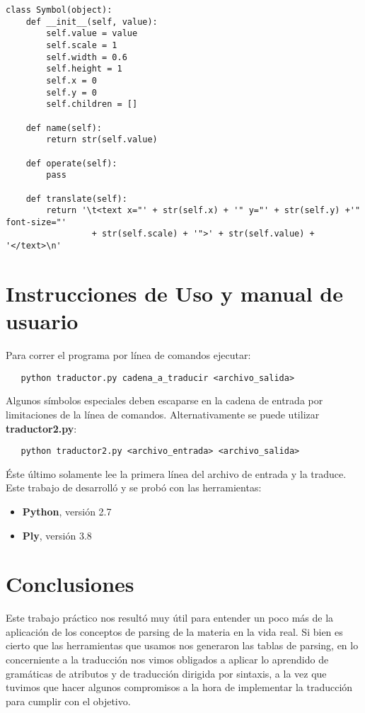\begin{verbatim}
class Symbol(object):
    def __init__(self, value):
        self.value = value
        self.scale = 1
        self.width = 0.6
        self.height = 1
        self.x = 0
        self.y = 0
        self.children = []

    def name(self):
        return str(self.value)

    def operate(self):
        pass

    def translate(self):
        return '\t<text x="' + str(self.x) + '" y="' + str(self.y) +'" font-size="' 
                 + str(self.scale) + '">' + str(self.value) + '</text>\n'
\end{verbatim}


\newpage

\section{Instrucciones de Uso y manual de usuario}

\indent \indent Para correr el programa por línea de comandos ejecutar:\\
\begin{verbatim}
   python traductor.py cadena_a_traducir <archivo_salida>
\end{verbatim}
\indent Algunos símbolos especiales deben escaparse en la cadena de entrada por limitaciones de la línea de comandos. 
\indent Alternativamente se puede utilizar \textbf{traductor2.py}:
\begin{verbatim}
   python traductor2.py <archivo_entrada> <archivo_salida>
\end{verbatim}
\indent Éste último solamente lee la primera línea del archivo de entrada y la traduce.\\

\indent Este trabajo de desarrolló y se probó con las herramientas:
\begin{itemize}
\item \textbf{Python}, versión 2.7
\item \textbf{Ply}, versión 3.8
\end{itemize}

\section{Conclusiones}

\indent Este trabajo práctico nos resultó muy útil para entender un poco más de la aplicación de los conceptos de parsing de la materia en la vida real. Si bien es cierto que las herramientas que usamos nos generaron las tablas de parsing, en lo concerniente a la traducción nos vimos obligados a aplicar lo aprendido de gramáticas de atributos y de traducción dirigida por sintaxis, a la vez que tuvimos que hacer algunos compromisos a la hora de implementar la traducción para cumplir con el objetivo.\\


